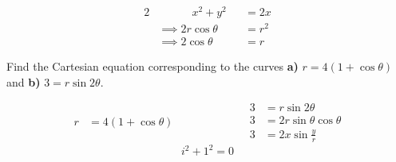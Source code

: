 	\begin{alignat*}{2}
	& \qquad \quad x^2+y^2  &   & = 2x  \\    
	& \implies 2r\cos\theta &   & = r^2 \\
	& \implies 2\cos\theta  &   & = r   
	\end{alignat*}
	
	
	\hrulefill
	\begin{example}
		Find the Cartesian equation corresponding to the curves \textbf{a)} $r=4(1+\cos\theta)$ and \textbf{b)} $3 = r\sin 2\theta$.
	\end{example}
	\begin{equation*}
	\begin{split}
	r &= 4(1+\cos\theta)
	\end{split}
	\qquad \qquad \qquad
	\begin{split}
	3 &= r\sin2\theta\\
	3 &= 2r\sin\theta\cos\theta\\	
	3  &= 2x\sin\frac yr
	\end{split}
	\end{equation*}
	$$i^2 + 1^2 = 0$$
	
	\newpage
